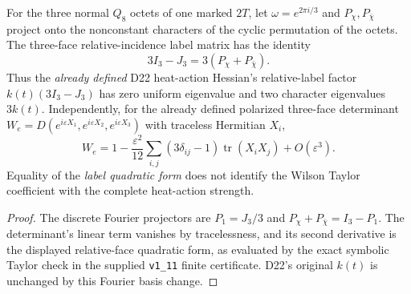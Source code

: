 \documentclass[12pt,a4paper]{article}
\begin{document}
\begin{proposition}
\label{p10:prop:v366-hurwitz-character-hessian}
For the three normal $Q_8$ octets of one marked $2T$, let
$\omega=e^{2\pi i/3}$ and $P_{\chi},P_{\bar\chi}$ project onto
the nonconstant characters of the cyclic permutation of the octets.
The three-face relative-incidence label matrix has the identity
\[
 \boxed{3I_3-J_3=3(P_{\chi}+P_{\bar\chi})}.
\]
Thus the \emph{already defined} D22 heat-action Hessian's
relative-label factor $k(t)(3I_3-J_3)$ has zero uniform eigenvalue
and two character eigenvalues $3k(t)$.  Independently, for the
already defined polarized three-face determinant
$W_e=D(e^{i\varepsilon X_1},e^{i\varepsilon X_2},
 e^{i\varepsilon X_3})$ with traceless Hermitian $X_i$,
\[
 \boxed{W_e=1-\frac{\varepsilon^2}{12}
  \sum_{i,j}(3\delta_{ij}-1)\operatorname{tr}(X_iX_j)
  +O(\varepsilon^3)}.
\]
Equality of the \emph{label quadratic form} does not identify the
Wilson Taylor coefficient with the complete heat-action strength.
\end{proposition}
\begin{proof}
The discrete Fourier projectors are
$P_1=J_3/3$ and $P_{\chi}+P_{\bar\chi}=I_3-P_1$.
The determinant's linear term vanishes by tracelessness, and its
second derivative is the displayed relative-face quadratic form,
as evaluated by the exact symbolic Taylor check in the supplied
\texttt{v1\_11} finite certificate.  D22's original $k(t)$ is
unchanged by this Fourier basis change.
\end{proof}
\end{document}
